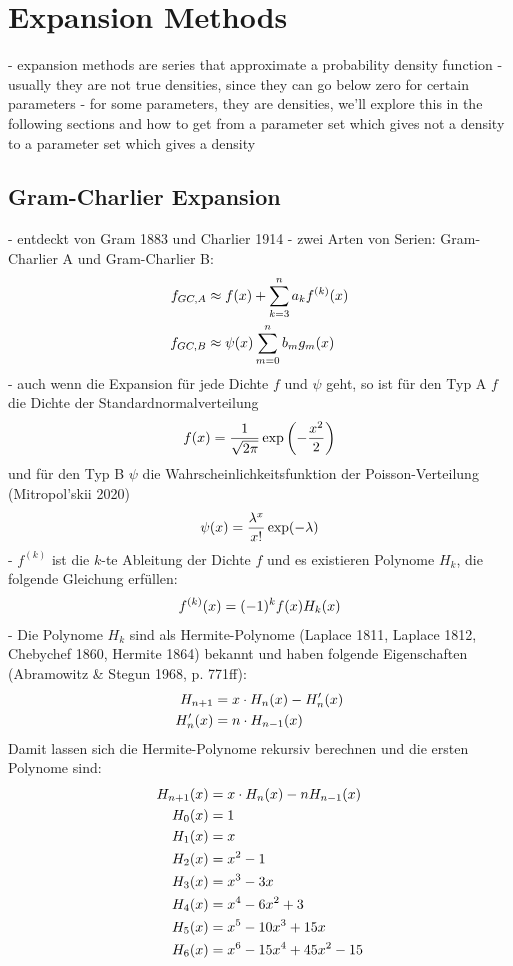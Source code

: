 \label{sec:expansion_methods}
\section{Expansion Methods}
- expansion methods are series that approximate a probability density function
- usually they are not true densities, since they can go below zero for certain parameters
- for some parameters, they are densities, we'll explore this in the following sections and how to get from a parameter set which gives not a density to a parameter set which gives a density

\subsection{Gram-Charlier Expansion}
- entdeckt von Gram 1883 und Charlier 1914
- zwei Arten von Serien: Gram-Charlier A und Gram-Charlier B:
\begin{align}
    f_{GC,A} &\approx f(x) + \sum_{k=3}^n a_k f^{(k)}(x) \notag \\
    f_{GC,B} &\approx \psi(x)\sum_{m=0}^n b_mg_m(x) \notag
\end{align}
- auch wenn die Expansion für jede Dichte $f$ und $\psi$ geht, so ist für den Typ A $f$ die Dichte der Standardnormalverteilung
\begin{align}
    f(x) = \frac{1}{\sqrt{2\pi}}\exp\left(-\frac{x^2}{2}\right) \notag
\end{align}
und für den Typ B $\psi$ die Wahrscheinlichkeitsfunktion der Poisson-Verteilung (Mitropol'skii 2020)
\begin{align}
    \psi(x) = \frac{\lambda^x}{x!}\exp(-\lambda) \notag
\end{align}
- $f^{(k)}$ ist die $k$-te Ableitung der Dichte $f$ und es existieren Polynome $H_k$, die folgende Gleichung erfüllen:
\begin{align}
    f^{(k)}(x) = (-1)^k f(x)H_k(x) \notag
\end{align}
- Die Polynome $H_k$ sind als Hermite-Polynome (Laplace 1811, Laplace 1812, Chebychef 1860, Hermite 1864) bekannt und haben folgende Eigenschaften (Abramowitz & Stegun 1968, p. 771ff):
\begin{align}
    H_{n+1} &= x\cdot H_n(x) - H'_n(x) \notag \\
    H'_n(x) &= n\cdot H_{n-1}(x) \notag \\
\end{align}
Damit lassen sich die Hermite-Polynome rekursiv berechnen und die ersten Polynome sind:
\begin{align}
    H_{n+1}(x) &= x\cdot H_n(x) - nH_{n-1}(x) \notag \\
    H_0(x) &= 1 \notag \\
    H_1(x) &= x \notag \\
    H_2(x) &= x^2 - 1 \notag \\
    H_3(x) &= x^3-3x \notag \\
    H_4(x) &= x^4-6x^2+3 \notag \\
    H_5(x) &= x^5-10x^3+15x \notag \\
    H_6(x) &= x^6-15x^4+45x^2-15 \notag
\end{align}
